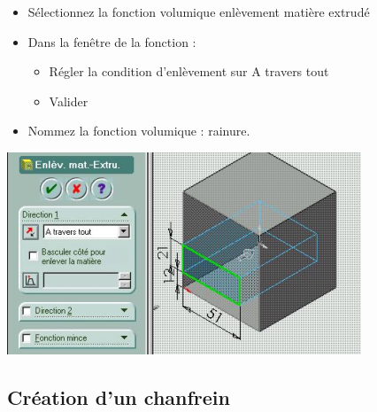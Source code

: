 \begin{minipage}{0.75\linewidth}
\begin{itemize}
 \item Sélectionnez la fonction volumique enlèvement matière extrudé
 \item Dans la fenêtre de la fonction :
 \begin{itemize}
 \item Régler la condition d'enlèvement sur A travers tout
 \item Valider
 \end{itemize}
 \item Nommez la fonction volumique : rainure.
\end{itemize}
\end{minipage}
\hfill
\begin{minipage}{0.23\linewidth}
\includegraphics[width=0.9\linewidth]{img/009}
\end{minipage}

\subsection{Création d'un chanfrein}

